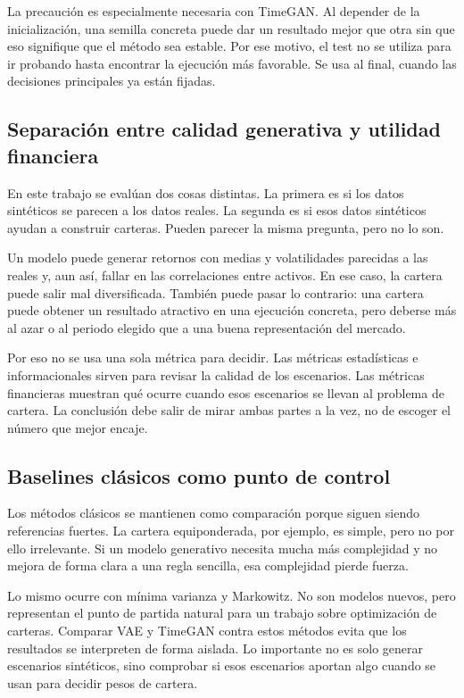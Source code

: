 \documentclass[11pt,a4paper,spanish,oneside]{book}
\numberwithin{equation}{chapter}
\numberwithin{figure}{chapter}
\begin{document}
La precaución es especialmente necesaria con TimeGAN. Al depender de la inicialización, una semilla concreta puede dar un resultado mejor que otra sin que eso signifique que el método sea estable. Por ese motivo, el test no se utiliza para ir probando hasta encontrar la ejecución más favorable. Se usa al final, cuando las decisiones principales ya están fijadas.

\subsection{Separación entre calidad generativa y utilidad financiera}

En este trabajo se evalúan dos cosas distintas. La primera es si los datos sintéticos se parecen a los datos reales. La segunda es si esos datos sintéticos ayudan a construir carteras. Pueden parecer la misma pregunta, pero no lo son.

Un modelo puede generar retornos con medias y volatilidades parecidas a las reales y, aun así, fallar en las correlaciones entre activos. En ese caso, la cartera puede salir mal diversificada. También puede pasar lo contrario: una cartera puede obtener un resultado atractivo en una ejecución concreta, pero deberse más al azar o al periodo elegido que a una buena representación del mercado.

Por eso no se usa una sola métrica para decidir. Las métricas estadísticas e informacionales sirven para revisar la calidad de los escenarios. Las métricas financieras muestran qué ocurre cuando esos escenarios se llevan al problema de cartera. La conclusión debe salir de mirar ambas partes a la vez, no de escoger el número que mejor encaje.

\subsection{Baselines clásicos como punto de control}

Los métodos clásicos se mantienen como comparación porque siguen siendo referencias fuertes. La cartera equiponderada, por ejemplo, es simple, pero no por ello irrelevante. Si un modelo generativo necesita mucha más complejidad y no mejora de forma clara a una regla sencilla, esa complejidad pierde fuerza.

Lo mismo ocurre con mínima varianza y Markowitz. No son modelos nuevos, pero representan el punto de partida natural para un trabajo sobre optimización de carteras. Comparar VAE y TimeGAN contra estos métodos evita que los resultados se interpreten de forma aislada. Lo importante no es solo generar escenarios sintéticos, sino comprobar si esos escenarios aportan algo cuando se usan para decidir pesos de cartera.
\end{document}
